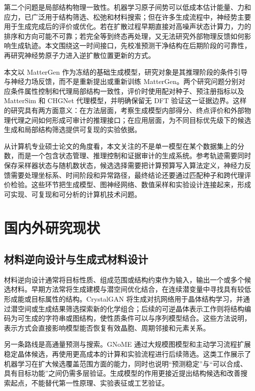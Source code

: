 第二个问题是局部结构物理一致性。机器学习原子间势可以低成本估计能量、力和应力，已广泛用于结构筛选、松弛和材料搜索\citep{merchant2023,chen2022,batzner2022,batatia2022,deng2023,yang2024mattersim}；但在许多生成流程中，神经势主要用于生成完成后的评价或优化。若在扩散过程早期直接对高噪声状态计算力，力的排序和方向可能不可靠；若完全等到终态再处理，又无法研究外部物理反馈如何影响生成轨迹。本文围绕这一时间接口，先校准预测干净结构在后期阶段的可靠性，再研究神经势原子力进入逆扩散位置更新的方式。

本文以 MatterGen 作为冻结的基础生成模型，研究对象是其推理阶段的条件引导与神经力场反馈，而不是重新提出或重新训练 MatterGen。两个研究问题分别对应条件属性控制和代理局部结构一致性，评价时使用配对种子、预注册指标以及 Matter\allowbreak Sim 和 CHGNet 代理模型，并明确保留无 DFT 验证这一证据边界。这样的研究具有两方面意义：在方法层面，考察生成模型内部得分、终点评价和外部物理代理之间如何形成可审计的推理接口；在应用层面，为不同目标优先级下的候选生成和局部结构筛选提供可复现的实验依据。

从计算机专业硕士论文的角度看，本文关注的不是单一模型在某个数据集上的分数，而是一个包含状态管理、推理控制和证据审计的生成系统。参考轨迹需要同时保存采样器状态与随机数状态，候选选择需要把计算预算写入算法定义，神经力反馈需要处理坐标系、时间阶段和异常路径，最终结论还要通过匹配种子和跨代理评价检验。这些环节把生成模型、图神经网络、数值采样和实验设计连接起来，形成可实现、可复现和可分析的计算机技术问题。

\section{国内外研究现状}

\subsection{材料逆向设计与生成式材料设计}

材料逆向设计通常将目标性质、组成范围或结构约束作为输入，输出一个或多个候选材料。早期方法常将生成建模与潜空间优化结合，在连续潜变量中寻找具有较低形成能或目标属性的结构。CrystalGAN 将生成对抗网络用于晶体结构学习，并通过潜空间或生成结果筛选探索新的化学组合\citep{nouira2018}；后续的可逆晶体表示工作则将结构编码为可生成的字符串或图结构，使性质条件可以与序列模型结合\citep{xiao2023}。这些方法说明，表示方式会直接影响模型能否恢复有效晶胞、周期邻接和元素关系。

另一条路线是高通量预测与搜索。GNoME 通过大规模图模型和主动学习流程扩展稳定晶体候选，再使用更高成本的计算和实验流程进行后续筛选\citep{merchant2023}。这类工作展示了机器学习在扩大候选覆盖范围方面的能力，同时也说明``预测稳定''与``可以合成、具有目标功能''之间仍需多层验证。生成模型的作用更接近提出结构候选和改善搜索起点，不能替代第一性原理、实验表征或工艺验证。

